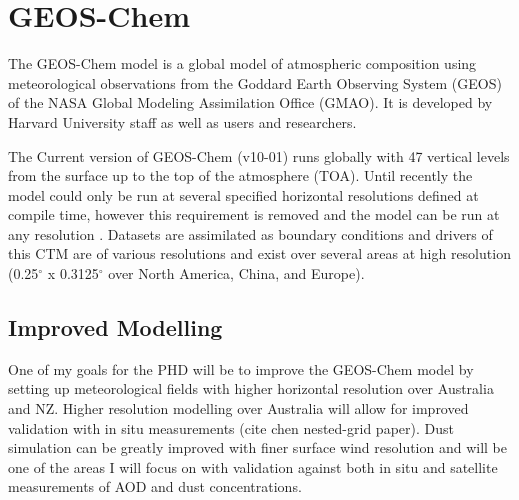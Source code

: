\section{GEOS-Chem}
The GEOS-Chem model is a global model of atmospheric composition using meteorological observations from the Goddard Earth Observing System (GEOS) of the NASA Global Modeling Assimilation Office (GMAO). It is developed by Harvard University staff as well as users and researchers. 

The Current version of GEOS-Chem (v10-01) runs globally with 47 vertical levels from the surface up to the top of the atmosphere (TOA). 
Until recently the model could only be run at several specified horizontal resolutions defined at compile time, however this requirement is removed and the model can be run at any resolution \cite{Long_2015}.
Datasets are assimilated as boundary conditions and drivers of this CTM are of various resolutions and exist over several areas at high resolution (0.25$^{\circ}$ x 0.3125$^{\circ}$ over North America, China, and Europe).

\subsection{Improved Modelling}
One of my goals for the PHD will be to improve the GEOS-Chem model by setting up meteorological fields with higher horizontal resolution over Australia and NZ.
Higher resolution modelling over Australia will allow for improved validation with in situ measurements (cite chen nested-grid paper). 
Dust simulation can be greatly improved with finer surface wind resolution and will be one of the areas I will focus on with validation against both in situ and satellite measurements of AOD and dust concentrations.

